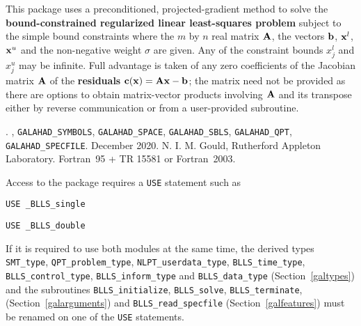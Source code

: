 \documentclass{galahad}
\newcommand{\packagename}{BLLS}
\newcommand{\fullpackagename}{\libraryname\_\packagename}
\begin{document}
\galheader


\galsummary
This package uses a preconditioned, projected-gradient method
to solve the {\bf bound-constrained regularized linear least-squares problem}
subject to the simple bound constraints
where the $m$ by $n$ real matrix ${\mathbf{A}}$, the vectors 
${\mathbf{b}}$, ${\mathbf{x}}^{l}$, ${\mathbf{x}}^{u}$ and the non-negative weight $\sigma$ are given.
Any of the constraint bounds $x_{j}^{l}$ and $x_{j}^{u}$ may be infinite.
Full advantage is taken of any zero coefficients of the Jacobian matrix ${\mathbf{A}}$
of the {\bf residuals} ${\mathbf{c}}({\mathbf{x}}) = {\mathbf{A}} {\mathbf{x}} - {\mathbf{b}}$;
the matrix need not be provided as there are options to obtain matrix-vector
products involving ${\mathbf{A}}$ and its transpose either by reverse communication
or from a user-provided subroutine.


\galattributes
\galversions{\tt  \fullpackagename\_single, \fullpackagename\_double}.
,
{\tt GALAHAD\_SY\-M\-BOLS},
{\tt GALAHAD\-\_\-SPACE},
{\tt GALAHAD\_SBLS},
{\tt GALAHAD\_QPT},
{\tt GALAHAD\_SPECFILE}.
\galdate December 2020.
\galorigin N. I. M. Gould, Rutherford Appleton Laboratory.
\gallanguage Fortran~95 + TR 15581 or Fortran~2003.


\galhowto


Access to the package requires a {\tt USE} statement such as

\medskip{}

\hspace{8mm} {\tt USE \fullpackagename\_single}

\medskip{}

\hspace{8mm} {\tt USE  \fullpackagename\_double}

\medskip

\noindent
If it is required to use both modules at the same time, the derived types
{\tt SMT\_type},
{\tt QPT\_problem\_type},
{\tt NLPT\_userdata\-\_type},
{\tt \packagename\_time\_type},
{\tt \packagename\_control\_type},
{\tt \packagename\_inform\_type}
and
{\tt \packagename\_data\_type}
(Section~\ref{galtypes})
and the subroutines
{\tt \packagename\_initialize},
{\tt \packagename\_\-solve},
{\tt \packagename\_terminate},
(Section~\ref{galarguments})
and
{\tt \packagename\_read\_specfile}
(Section~\ref{galfeatures})
must be renamed on one of the {\tt USE} statements.
\end{document}
